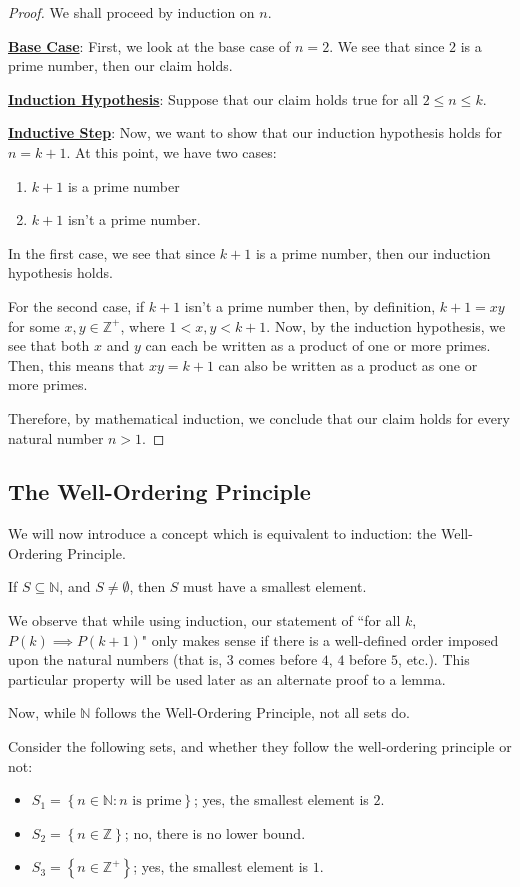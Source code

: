\documentclass[openany]{book}
\newcommand{\NN}{\mathbb{N}}
\newcommand{\ZZ}{\mathbb{Z}}
\begin{document}
	\begin{proof}
		We shall proceed by induction on $n$.
		
		\underline{\textbf{Base Case}}: First, we look at the base case of $n=2$. We see that since $2$ is a prime number, then our claim holds.
		
		\underline{\textbf{Induction Hypothesis}}: Suppose that our claim holds true for all $2 \leq n \leq k$.
		
		\underline{\textbf{Inductive Step}}: Now, we want to show that our induction hypothesis holds for $n=k+1$. At this point, we have two cases:
		\begin{enumerate}
			\item $k+1$ is a prime number
			\item $k+1$ isn't a prime number.
		\end{enumerate}
	
		In the first case, we see that since $k+1$ is a prime number, then our induction hypothesis holds.
		
		For the second case, if $k+1$ isn't a prime number then, by definition, $k+1 = xy$ for some $x, y \in \ZZ^{+}$, where $1 < x,y < k+1$. Now, by the induction hypothesis, we see that both $x$ and $y$ can each be written as a product of one or more primes. Then, this means that $xy=k+1$ can also be written as a product as one or more primes.
		
		Therefore, by mathematical induction, we conclude that our claim holds for every natural number $n > 1$.
	\end{proof}
\subsection{The Well-Ordering Principle}

We will now introduce a concept which is equivalent to induction: the Well-Ordering Principle.
\begin{defn}
	If $S \subseteq \NN$, and $S \not= \emptyset$, then $S$ must have a smallest element. 
\end{defn}

We observe that while using induction, our statement of ``for all $k$, $P(k) \implies P(k+1)$" only makes sense if there is a well-defined order imposed upon the natural numbers (that is, $3$ comes before $4$, $4$ before $5$, etc.). This particular property will be used later as an alternate proof to a lemma.

Now, while $\NN$ follows the Well-Ordering Principle, not all sets do.
\begin{example}
	Consider the following sets, and whether they follow the well-ordering principle or not:
	\begin{itemize}
		\item $S_{1} = \left\{  n \in \NN : n \text{ is prime}\right\}$; yes, the smallest element is $2$.
		\item $S_{2} = \left\{  n \in \ZZ\right\}$; no, there is no lower bound.
		\item $S_{3} = \left\{  n \in \ZZ^{+} \right\}$; yes, the smallest element is $1$.
	\end{itemize}
\end{example}
\end{document}
